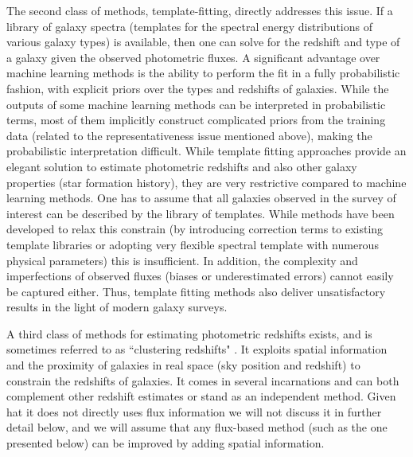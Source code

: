 \documentclass[aps,prd,showpacs,superscriptaddress,groupedaddress]{revtex4}  %
\begin{document}
The second class of methods, template-fitting, directly addresses this issue. 
If a library of galaxy spectra (\ie templates for the spectral energy distributions of various galaxy types) is available, then one can solve for the redshift and type of a galaxy given the observed photometric fluxes.
A significant advantage over machine learning methods is the ability to perform the fit in a fully probabilistic fashion, with explicit priors over the types and redshifts of galaxies.
While the outputs of some machine learning methods can be interpreted in probabilistic terms, most of them implicitly construct complicated priors from the training data (related to the representativeness issue mentioned above), making the probabilistic interpretation difficult.
While template fitting approaches provide an elegant solution to estimate photometric redshifts and also other galaxy properties (\eg star formation history), they are very restrictive compared to machine learning methods.
One has to assume that all galaxies observed in the survey of interest can be described by the library of templates. 
While methods have been developed to relax this constrain (\eg by introducing correction terms to existing template libraries or adopting very flexible spectral template with numerous physical parameters) this is insufficient.
In addition, the complexity and imperfections of observed fluxes (\eg biases or underestimated errors) cannot easily be captured either.
Thus, template fitting methods also deliver unsatisfactory results in the light of modern galaxy surveys.

A third class of methods for estimating photometric redshifts exists, and is sometimes referred to as ``clustering redshifts" \citep[\eg][]{Matthews:2010an}.
It exploits spatial information and the proximity of galaxies in real space (sky position and redshift) to constrain the redshifts of galaxies.
It comes in several incarnations and can both complement other redshift estimates or stand as an independent \photoz method.
Given hat it does not directly uses flux information we will not discuss it in further detail below, and we will assume that any flux-based \photoz method (such as the one presented below) can be improved by adding spatial information.
\end{document}

